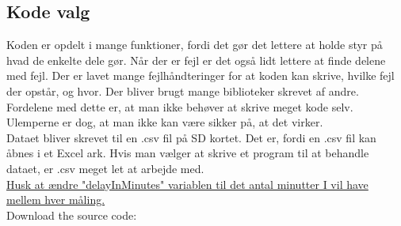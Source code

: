 	\subsection{Kode valg}
		Koden er opdelt i mange funktioner, fordi det gør det lettere at holde styr på hvad de enkelte dele gør. Når der er fejl er det også lidt lettere at finde delene med fejl. Der er lavet mange fejlhåndteringer for at koden kan skrive, hvilke fejl der opstår, og hvor. Der bliver brugt mange biblioteker skrevet af andre. Fordelene med dette er, at man ikke behøver at skrive meget kode selv. Ulemperne er dog, at man ikke kan være sikker på, at det virker. \\ [7pt]
		Dataet bliver skrevet til en .csv fil på SD kortet. Det er, fordi en .csv fil kan åbnes i et Excel ark. Hvis man vælger at skrive et program til at behandle dataet, er .csv meget let at arbejde med.\\ [15pt]
		\underline{Husk at ændre "delayInMinutes"{} variablen til det antal minutter I vil have mellem hver måling.}\\ [7pt]
		Download the source code: 